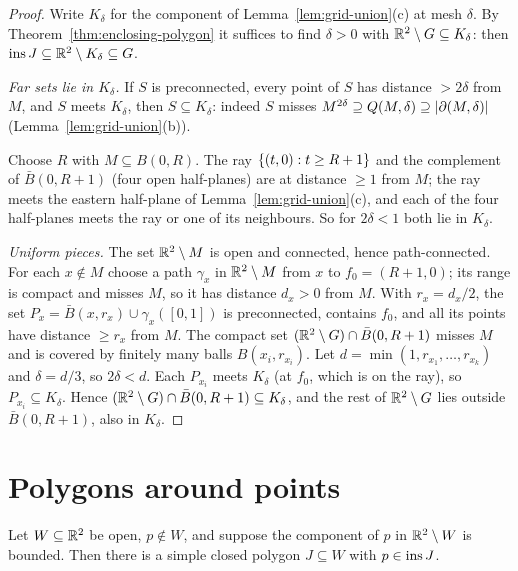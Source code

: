 \begin{proof}
Write $K_\delta$ for the component of Lemma~\ref{lem:grid-union}(c) at mesh $\delta$. By
Theorem~\ref{thm:enclosing-polygon} it suffices to find $\delta>0$ with $\mathbb{R}^2\setminus G\subseteq
K_\delta$: then $\operatorname{ins} J\subseteq\mathbb{R}^2\setminus K_\delta\subseteq G$.

\emph{Far sets lie in $K_\delta$.} If $S$ is preconnected, every point of $S$ has distance $>2\delta$
from $M$, and $S$ meets $K_\delta$, then $S\subseteq K_\delta$: indeed $S$ misses
$M^{2\delta}\supseteq Q(M,\delta)\supseteq\lvert \partial(M,\delta)\rvert$ (Lemma~\ref{lem:grid-union}(b)).

Choose $R$ with $M\subseteq B(0,R)$. The ray $\left\{ (t,0):t\ge R+1 \right\}$ and the complement of
$\bar B(0,R+1)$ (four open half-planes) are at distance $\ge1$ from $M$; the ray meets the eastern
half-plane of Lemma~\ref{lem:grid-union}(c), and each of the four half-planes meets the ray or one of
its neighbours. So for $2\delta<1$ both lie in $K_\delta$.

\emph{Uniform pieces.} The set $\mathbb{R}^2\setminus M$ is open and connected, hence path-connected. For
each $x\notin M$ choose a path $\gamma_x$ in $\mathbb{R}^2\setminus M$ from $x$ to $f_0=(R+1,0)$; its range is
compact and misses $M$, so it has distance $d_x>0$ from $M$. With $r_x=d_x/2$, the set
$P_x=\bar B(x,r_x)\cup\gamma_x([0,1])$ is preconnected, contains $f_0$, and all its points have
distance $\ge r_x$ from $M$. The compact set $(\mathbb{R}^2\setminus G)\cap\bar B(0,R+1)$ misses $M$ and is
covered by finitely many balls $B(x_i,r_{x_i})$. Let $d=\min(1,r_{x_1},\dots,r_{x_k})$ and
$\delta=d/3$, so $2\delta<d$. Each $P_{x_i}$ meets $K_\delta$ (at $f_0$, which is on the ray), so
$P_{x_i}\subseteq K_\delta$. Hence $(\mathbb{R}^2\setminus G)\cap\bar B(0,R+1)\subseteq K_\delta$, and the rest of
$\mathbb{R}^2\setminus G$ lies outside $\bar B(0,R+1)$, also in $K_\delta$.
\end{proof}


\section{Polygons around points}

\begin{theorem}\label{thm:polygon-around}
Let $W\subseteq\mathbb{R}^2$ be open, $p\notin W$, and suppose the component of $p$ in $\mathbb{R}^2\setminus W$ is
bounded. Then there is a simple closed polygon $J\subseteq W$ with $p\in\operatorname{ins} J$.
\end{theorem}

